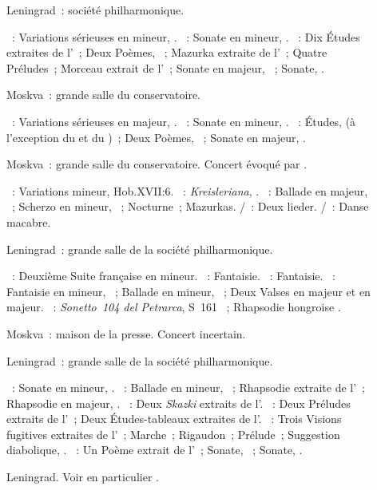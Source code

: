 \begin{description}
 \item[]
 Leningrad~: société philharmonique.

 \textsc{\Mendelssohn{}}~: Variations sérieuses en \kD mineur, .
 \textsc{\Chopin{}}~: Sonate en \kB mineur, .
 \textsc{\Scriabine{}}~: Dix Études extraites de l'~; Deux Poèmes,
 ~; Mazurka extraite de l'~; Quatre Préludes~; Morceau
 extrait de l'~; Sonate en \kF \Sharp majeur, ~; Sonate,
 .
 \item[]
 Moskva~: grande salle du conservatoire.

 \textsc{\Mendelssohn{}}~: Variations sérieuses en \kD majeur, .
 \textsc{\Chopin{}}~: Sonate en \kB mineur, .
 \textsc{\Scriabine{}}~: Études,  (à l'exception du  et du
 )~; Deux Poèmes, ~; Sonate en \kF \Sharp majeur,
 .
 \item[]
 Moskva~: grande salle du conservatoire.
 Concert évoqué par \citet[p.~247]{Lobanov08a}.

 \textsc{\Haydn{}}~: Variations \kF mineur, Hob.XVII:6.
 \textsc{\Schumann{}}~: \emph{Kreisleriana}, .
 \textsc{\Chopin{}}~: Ballade en \kA \Flat majeur, ~; Scherzo en
 \kC \Sharp mineur, ~; Nocturne~; Mazurkas.
 \textsc{\Schubert{}/\Liszt{}}~: Deux lieder.
 \textsc{\SaintSaens{}/\Liszt{}}~: Danse macabre.
 \item[]
 Leningrad~: grande salle de la société philharmonique.

 \textsc{\JBach{}}~: Deuxième Suite française en \kD mineur.
 \textsc{\Mozart{}}~: Fantaisie.
 \textsc{\Schubert{}}~: Fantaisie.
 \textsc{\Chopin{}}~: Fantaisie en \kF mineur, ~; Ballade en \kG
 mineur, ~; Deux Valses en \kA \Flat majeur et en \kE \Flat majeur.
 \textsc{\Liszt{}}~: \emph{Sonetto~104 del Petrarca}, S~161 ~;
 Rhapsodie hongroise .
 \item[]
 Moskva~: maison de la presse.
 Concert incertain.
 \item[]
 Leningrad~: grande salle de la société philharmonique.

 \textsc{\Schumann{}}~: Sonate en \kG mineur, .
 \textsc{\Brahms{}}~: Ballade en \kG mineur,  ~;
 Rhapsodie extraite de l'~; Rhapsodie en \kE \Flat majeur,
  .
 \textsc{\Medtner{}}~: Deux \emph{Skazki} extraits de l'.
 \textsc{\Rachmaninov{}}~: Deux Préludes extraits de l'~; Deux
 Études-tableaux extraites de l'.
 \textsc{\Prokofiev{}}~: Trois Visions fugitives extraites de l'~;
 Marche~; Rigaudon~; Prélude~; Suggestion diabolique,  .
 \textsc{\Scriabine{}}~: Un Poème extrait de l'~; Sonate,
 ~; Sonate, .
 \item[]
 Leningrad.
 Voir en particulier \citet[p.~427]{Milshteyn82a}.


\end{description}
